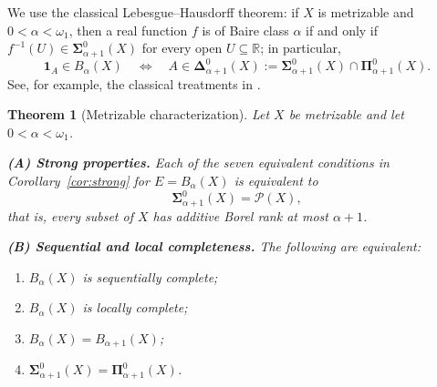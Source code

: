 \documentclass[11pt]{article}
\newtheorem{theorem}{Theorem}
\newcommand{\R}{\mathbb{R}}
\newcommand{\cP}{\mathcal{P}}
\begin{document}
We use the classical Lebesgue--Hausdorff theorem: if $X$ is metrizable and
$0<\alpha<\omega_1$, then a real function $f$ is of Baire class $\alpha$ if
and only if $f^{-1}(U)\in\boldsymbol\Sigma^0_{\alpha+1}(X)$ for every open
$U\subseteq\R$; in particular,
\[
 \mathbf 1_A\in B_\alpha(X)
 \quad\Longleftrightarrow\quad
 A\in\boldsymbol\Delta^0_{\alpha+1}(X)
 :=\boldsymbol\Sigma^0_{\alpha+1}(X)
   \cap\boldsymbol\Pi^0_{\alpha+1}(X).
\]
See, for example, the classical treatments in
\cite{Kuratowski,Kechris}.

\begin{theorem}[Metrizable characterization]\label{thm:metric}
Let $X$ be metrizable and let $0<\alpha<\omega_1$.

\medskip\noindent
\textbf{(A) Strong properties.}
Each of the seven equivalent conditions in Corollary~\ref{cor:strong} for
$E=B_\alpha(X)$ is equivalent to
\[
        \boldsymbol\Sigma^0_{\alpha+1}(X)=\cP(X),
\]
that is, every subset of $X$ has additive Borel rank at most $\alpha+1$.

\medskip\noindent
\textbf{(B) Sequential and local completeness.}
The following are equivalent:
\begin{enumerate}
\item $B_\alpha(X)$ is sequentially complete;
\item $B_\alpha(X)$ is locally complete;
\item $B_\alpha(X)=B_{\alpha+1}(X)$;
\item
$\boldsymbol\Sigma^0_{\alpha+1}(X)
 =\boldsymbol\Pi^0_{\alpha+1}(X)$.
\end{enumerate}
\end{theorem}
\end{document}
